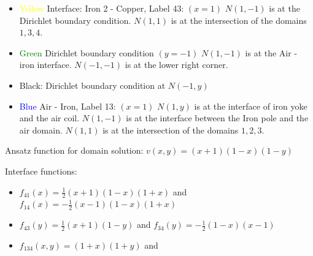 \documentclass[12pt]{article}
\begin{document}
\begin{itemize}
	\item \textcolor{yellow}{Yellow} Interface: Iron 2 - Copper, Label 43: $(x=1)$ $N(1,-1)$ is at the Dirichlet boundary condition. $N(1,1)$ is at the intersection of the domains $1,3,4$.
	\item \textcolor{green}{Green} Dirichlet boundary condition $(y=-1)$ $N(1,-1)$ is at the Air - iron interface. $N(-1,-1)$ is at the lower right corner.
     \item Black: Dirichlet boundary condition at $N(-1,y)$
     
     \item \textcolor{blue}{Blue} Air - Iron, Label 13: $(x=1)$ $N(1,y)$ is at the interface of iron yoke and the air coil. $N(1,-1)$ is at the interface between the Iron pole and the air domain. $N(1,1)$ is at the intersection of the domains $1,2,3$.
\end{itemize}
Ansatz function for domain solution: $v(x,y) = (x+1)(1-x)(1-y)$

Interface functions:
\begin{itemize}
	\item $f_{41}(x) = \frac{1}{2} (x+1)(1-x)(1+x)$ and $f_{14}(x) = -\frac{1}{2} (x-1)(1-x)(1+x)$
    \item $f_{43}(y) = \frac{1}{2} (x+1) (1-y)$  and $f_{34}(y) = -\frac{1}{2}(1-x)(x-1)$
    \item $f_{134}(x,y) = (1+x)(1+y)$ and 
\end{itemize}
\end{document}
